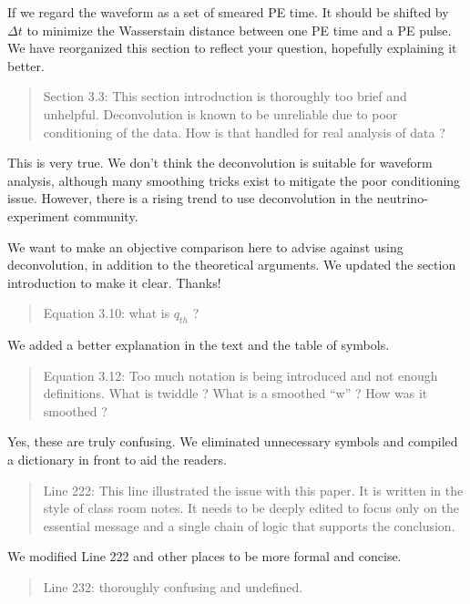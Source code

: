\documentclass[12pt]{article}
\begin{document}
If we regard the waveform as a set of smeared PE time. It should be shifted by $\Delta t$ to minimize the Wasserstain distance between one PE time and a PE pulse. We have reorganized this section to reflect your question, hopefully explaining it better.

\begin{quote}
Section 3.3: This section introduction is thoroughly too brief and unhelpful. Deconvolution is known to be unreliable due to poor conditioning of the data. How is that handled for real analysis of data ?
\end{quote}

This is very true.  We don't think the deconvolution is suitable for waveform analysis, although many smoothing tricks exist to mitigate the poor conditioning issue.  However, there is a rising trend to use deconvolution in the neutrino-experiment community.

We want to make an objective comparison here to advise against using deconvolution, in addition to the theoretical arguments.  We updated the section introduction to make it clear.  Thanks!

\begin{quote}
Equation 3.10: what is $q_{th}$ ?
\end{quote}

We added a better explanation in the text and the table of symbols.

\begin{quote}
Equation 3.12: Too much notation is being introduced and not enough definitions. What is twiddle ? What is a smoothed ``w'' ? How was it smoothed ?
\end{quote}

Yes, these are truly confusing. We eliminated unnecessary symbols and compiled a dictionary in front to aid the readers. 

\begin{quote}
Line 222: This line illustrated the issue with this paper. It is written in the style of class room notes. It needs to be deeply edited to focus only on the essential message and a single chain of logic that supports the conclusion.
\end{quote}

We modified Line 222 and other places to be more formal and concise.

\begin{quote}
Line 232: thoroughly confusing and undefined.
\end{quote}
\end{document}
